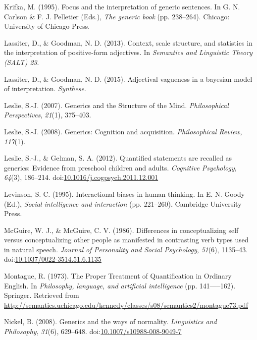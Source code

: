 \documentclass[english,floatsintext,man]{apa6}
\theoremstyle{definition}
\theoremstyle{definition}
\theoremstyle{definition}
\theoremstyle{remark}
\begin{document}
\hypertarget{ref-KrifkaGenericBookFocus}{}
Krifka, M. (1995). Focus and the interpretation of generic sentences. In
G. N. Carlson \& F. J. Pelletier (Eds.), \emph{The generic book} (pp.
238--264). Chicago: University of Chicago Press.

\hypertarget{ref-Lassiter2013}{}
Lassiter, D., \& Goodman, N. D. (2013). Context, scale structure, and
statistics in the interpretation of positive-form adjectives. In
\emph{Semantics and Linguistic Theory (SALT) 23}.

\hypertarget{ref-Lassiter2015}{}
Lassiter, D., \& Goodman, N. D. (2015). Adjectival vagueness in a
bayesian model of interpretation. \emph{Synthese}.

\hypertarget{ref-Leslie2007}{}
Leslie, S.-J. (2007). Generics and the Structure of the Mind.
\emph{Philosophical Perspectives}, \emph{21}(1), 375--403.

\hypertarget{ref-Leslie2008}{}
Leslie, S.-J. (2008). Generics: Cognition and acquisition.
\emph{Philosophical Review}, \emph{117}(1).

\hypertarget{ref-Leslie2012a}{}
Leslie, S.-J., \& Gelman, S. A. (2012). Quantified statements are
recalled as generics: Evidence from preschool children and adults.
\emph{Cognitive Psychology}, \emph{64}(3), 186--214.
doi:\href{https://doi.org/10.1016/j.cogpsych.2011.12.001}{10.1016/j.cogpsych.2011.12.001}

\hypertarget{ref-Levinson1995}{}
Levinson, S. C. (1995). Interactional biases in human thinking. In E. N.
Goody (Ed.), \emph{Social intelligence and interaction} (pp. 221--260).
Cambridge University Press.

\hypertarget{ref-McGuire1986}{}
McGuire, W. J., \& McGuire, C. V. (1986). Differences in conceptualizing
self versus conceptualizing other people as manifested in contrasting
verb types used in natural speech. \emph{Journal of Personality and
Social Psychology}, \emph{51}(6), 1135--43.
doi:\href{https://doi.org/10.1037/0022-3514.51.6.1135}{10.1037/0022-3514.51.6.1135}

\hypertarget{ref-Montague1973}{}
Montague, R. (1973). The Proper Treatment of Quantification in Ordinary
English. In \emph{Philosophy, language, and artificial intelligence}
(pp. 141-----162). Springer. Retrieved from
\url{http://semantics.uchicago.edu/kennedy/classes/s08/semantics2/montague73.pdf}

\hypertarget{ref-Nickel2008}{}
Nickel, B. (2008). Generics and the ways of normality. \emph{Linguistics
and Philosophy}, \emph{31}(6), 629--648.
doi:\href{https://doi.org/10.1007/s10988-008-9049-7}{10.1007/s10988-008-9049-7}
\end{document}
